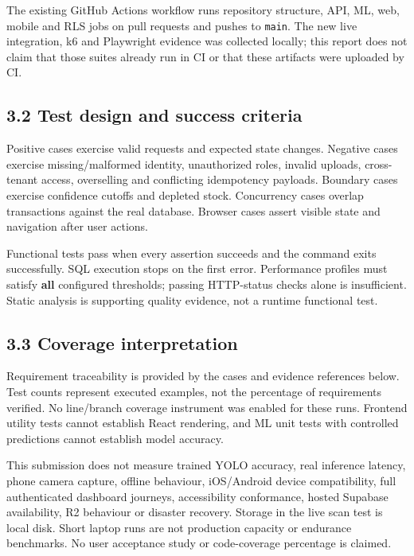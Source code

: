 \documentclass[
  11pt,
]{article}
\begin{document}
The existing GitHub Actions workflow runs repository structure, API, ML,
web, mobile and RLS jobs on pull requests and pushes to \texttt{main}.
The new live integration, k6 and Playwright evidence was collected
locally; this report does not claim that those suites already run in CI
or that these artifacts were uploaded by CI.

\subsection{3.2 Test design and success
criteria}\label{test-design-and-success-criteria}

Positive cases exercise valid requests and expected state changes.
Negative cases exercise missing/malformed identity, unauthorized roles,
invalid uploads, cross-tenant access, overselling and conflicting
idempotency payloads. Boundary cases exercise confidence cutoffs and
depleted stock. Concurrency cases overlap transactions against the real
database. Browser cases assert visible state and navigation after user
actions.

Functional tests pass when every assertion succeeds and the command
exits successfully. SQL execution stops on the first error. Performance
profiles must satisfy \textbf{all} configured thresholds; passing
HTTP-status checks alone is insufficient. Static analysis is supporting
quality evidence, not a runtime functional test.

\subsection{3.3 Coverage interpretation}\label{coverage-interpretation}

Requirement traceability is provided by the cases and evidence
references below. Test counts represent executed examples, not the
percentage of requirements verified. No line/branch coverage instrument
was enabled for these runs. Frontend utility tests cannot establish
React rendering, and ML unit tests with controlled predictions cannot
establish model accuracy.

This submission does not measure trained YOLO accuracy, real inference
latency, phone camera capture, offline behaviour, iOS/Android device
compatibility, full authenticated dashboard journeys, accessibility
conformance, hosted Supabase availability, R2 behaviour or disaster
recovery. Storage in the live scan test is local disk. Short laptop runs
are not production capacity or endurance benchmarks. No user acceptance
study or code-coverage percentage is claimed.
\end{document}
